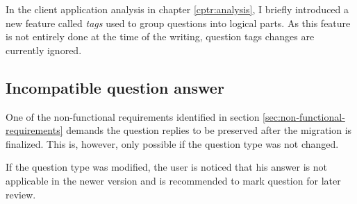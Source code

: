 In the client application analysis in chapter \ref{cptr:analysis}, I briefly introduced a new feature called \textit{tags} used to group questions into logical parts.
As this feature is not entirely done at the time of the writing, question tags changes are currently ignored.

\subsection{Incompatible question answer}

One of the non-functional requirements identified in section \ref{sec:non-functional-requirements} demands the question replies to be preserved after the migration is finalized.
This is, however, only possible if the question type was not changed.

If the question type was modified, the user is noticed that his answer is not applicable in the newer version and is recommended to mark question for later review.

